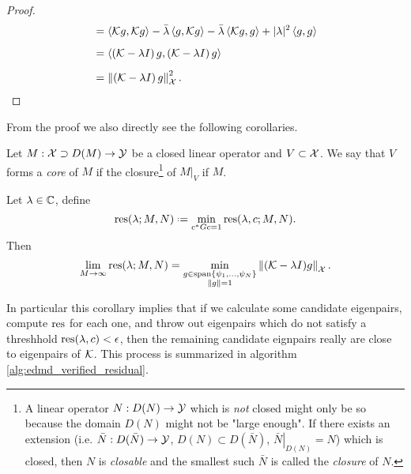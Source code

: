 \begin{proof}
\begin{equation}
\begin{split}
            &= \left\langle \mathcal{K} g, \mathcal{K} g \right\rangle
            - \bar{\lambda} \left\langle g, \mathcal{K} g \right\rangle
            - \bar{\lambda} \left\langle \mathcal{K} g, g \right\rangle
            + | \lambda |^2 \left\langle g, g \right\rangle \\[1.2ex]
            &= \left\langle \left( \mathcal{K} - \lambda I \right) g, 
            \left( \mathcal{K} - \lambda I \right) g \right\rangle \\[1.2ex]
            &= \left\| \left( \mathcal{K} - \lambda I \right) g \right\|_{\mathcal{X}}^2 . 
        \end{split}
    \end{equation}
\end{proof}

From the proof we also directly see the following corollaries. 

\begin{definition}
    Let $M : \mathcal{X} \supset D(M) \to \mathcal{Y}$ be a closed linear operator and 
    $V \subset \mathcal{X}$. We say that $V$ forms a \emph{core} of $M$ if the closure\footnote{
        A linear operator $N : D(N) \to \mathcal{Y}$ which is \emph{not} closed might only be so 
        because the domain $D(N)$ might not be "large enough". If there exists an extension 
        (i.e. $\bar{N} : D(\bar{N}) \to \mathcal{Y}$, $D(N) \subset D(\bar{N})$, 
        $\left. \bar{N} \right|_{D(N)} = N$) which is closed, then $N$ is \emph{closable} and 
        the smallest such $\bar{N}$ is called the \emph{closure} of $N$. 
    } 
    of $\left. M \right|_{V}$ if $M$. 
\end{definition}

\begin{corollary}
    Let $\lambda \in \mathbb{C}$, define
    \begin{equation}
        \res (\lambda; M, N)
        \defeq \min_{c^* G c = 1} \res (\lambda, c; M, N) . 
    \end{equation} 
    Then
    \begin{equation}
        \label{eq:resdmd_M_limit}
        \lim_{M \to \infty} \text{res} (\lambda; M, N)
        = \min_{\substack{g \in \text{span} \left\{ \psi_1, \ldots, \psi_N \right\} \\ \| g \| = 1}}
            \left\| ( \mathcal{K} - \lambda I ) g \right\|_{\mathcal{X}} . 
    \end{equation}
\end{corollary}

In particular this corollary implies that if we calculate some candidate eigenpairs, 
compute $\text{res}$ for each one, and throw out eigenpairs which do not satisfy 
a threshhold $\text{res} (\lambda, c) < \epsilon$, then the remaining candidate 
eignpairs really are close to eigenpairs of $\mathcal{K}$. This process is summarized in 
algorithm \ref{alg:edmd_verified_residual}. 

